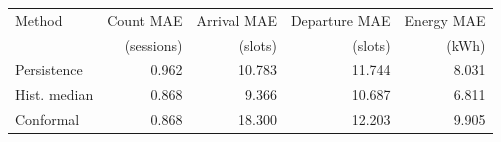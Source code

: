 \begin{tabular}{lrrrr}
\toprule
Method & Count MAE & Arrival MAE & Departure MAE & Energy MAE \\
 & (sessions) & (slots) & (slots) & (kWh) \\
\midrule
Persistence & 0.962 & 10.783 & 11.744 & 8.031 \\
Hist. median & 0.868 & 9.366 & 10.687 & 6.811 \\
Conformal & 0.868 & 18.300 & 12.203 & 9.905 \\
\bottomrule
\end{tabular}

